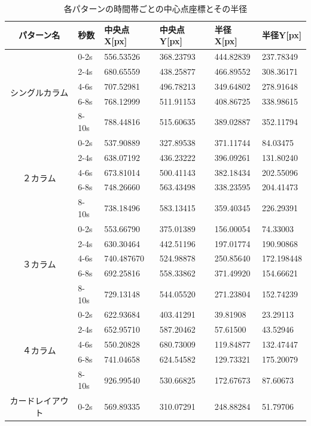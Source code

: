 \begin{table}[h]
  \caption{各パターンの時間帯ごとの中心点座標とその半径}
  \label{table:layoutresult}
  \footnotesize
  \centering
    \begin{tabular}{clllll}
    \hline
    パターン名 & 秒数 & 中央点X[px] & 中央点Y[px] & 半径X[px] & 半径Y[px] \\
    \hline \hline
    \multirow{5}{*}{シングルカラム} & 0-2s & 556.53526 & 368.23793 & 444.82839 & 237.78349 \\
    & 2-4s & 680.65559 & 438.25877 & 466.89552 & 308.36171 \\
    & 4-6s & 707.52981 & 496.78213 & 349.64802 & 278.91648 \\
    & 6-8s & 768.12999 & 511.91153 & 408.86725 & 338.98615 \\
    & 8-10s & 788.44816 & 515.60635 & 389.02887 & 352.11794 \\
    \hline
    \multirow{5}{*}{２カラム} & 0-2s & 537.90889 & 327.89538 & 371.11744 & 84.03475 \\
    & 2-4s & 638.07192 & 436.23222 & 396.09261 & 131.80240 \\
    & 4-6s & 673.81014 & 500.41143 & 382.18434 & 202.55096 \\
    & 6-8s & 748.26660 & 563.43498 & 338.23595 & 204.41473 \\
    & 8-10s & 738.18496 & 583.13415 & 359.40345 & 226.29391 \\
    \hline
    \multirow{5}{*}{３カラム} & 0-2s & 553.66790 & 375.01389 & 156.00054 & 74.33003 \\
    & 2-4s & 630.30464 & 442.51196 & 197.01774 & 190.90868 \\
    & 4-6s & 740.487670 & 524.98878 & 250.85640 & 172.198448 \\
    & 6-8s & 692.25816 & 558.33862 & 371.49920 & 154.66621 \\
    & 8-10s & 729.13148 & 544.05520 & 271.23804 & 152.74239 \\
    \hline
    \multirow{5}{*}{４カラム} & 0-2s & 622.93684 & 403.41291 & 39.81908 & 23.29113 \\
    & 2-4s & 652.95710 & 587.20462 & 57.61500 & 43.52946 \\
    & 4-6s & 550.20828 & 680.73009 & 119.84877 & 132.47447 \\
    & 6-8s & 741.04658 & 624.54582 & 129.73321 & 175.20079 \\
    & 8-10s & 926.99540 & 530.66825 & 172.67673 & 87.60673 \\
    \hline
    \multirow{5}{*}{カードレイアウト} & 0-2s & 569.89335 & 310.07291 & 248.88284 & 51.79706 \\

\end{tabular}
\end{table}
